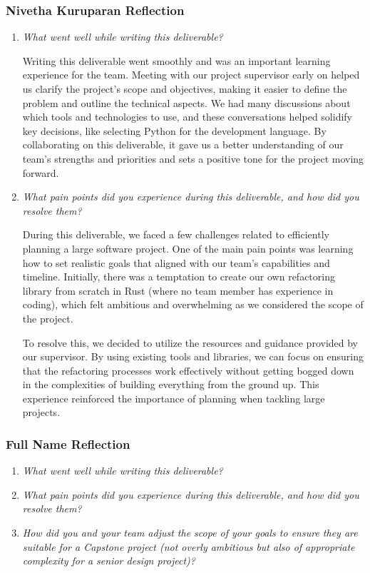 \documentclass{article}
\begin{document}
\subsubsection*{Nivetha Kuruparan Reflection}
\begin{enumerate}
  \item \textit{What went well while writing this deliverable?}

    Writing this deliverable went smoothly and was an important learning experience for the team. 
    Meeting with our project supervisor early on helped us clarify the project’s scope and objectives, 
    making it easier to define the problem and outline the technical aspects. We had many discussions 
    about which tools and technologies to use, and these conversations helped solidify key decisions, 
    like selecting Python for the development language. By collaborating on this deliverable, it gave 
    us a better understanding of our team's strengths and priorities and sets a positive tone for the 
    project moving forward.

  \item \textit{What pain points did you experience during this deliverable, and how did you resolve them?}
  
    During this deliverable, we faced a few challenges related to efficiently planning a large software 
    project. One of the main pain points was learning how to set realistic goals that aligned with our 
    team's capabilities and timeline. Initially, there was a temptation to create our own refactoring 
    library from scratch in Rust (where no team member has experience in coding), which felt ambitious 
    and overwhelming as we considered the scope of the project.

    To resolve this, we decided to utilize the resources and guidance provided by our supervisor. By using 
    existing tools and libraries, we can focus on ensuring that the refactoring processes work effectively 
    without getting bogged down in the complexities of building everything from the ground up. This 
    experience reinforced the importance of planning when tackling large projects.
    
\end{enumerate}

\subsubsection*{Full Name Reflection}
\begin{enumerate}
  \item \textit{What went well while writing this deliverable?}
  \item \textit{What pain points did you experience during this deliverable, and how did you resolve them?}
  \item \textit{How did you and your team adjust the scope of your goals to ensure they are suitable for a Capstone project (not overly 
  ambitious but also of appropriate complexity for a senior design project)?}
\end{enumerate}
\end{document}
